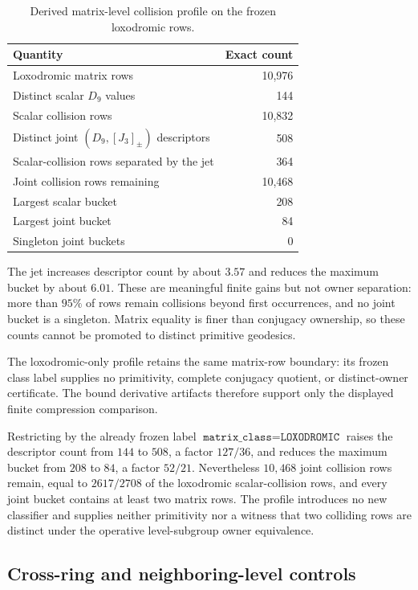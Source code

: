 \documentclass[11pt,a4paper]{article}
\theoremstyle{definition}
\theoremstyle{remark}
\begin{document}
\begin{table}[t]
\centering
\caption{Derived matrix-level collision profile on the frozen loxodromic rows.}
\label{tab:collision-loxodromic}
\begin{tabular}{lr}
\toprule
Quantity & Exact count \\
\midrule
Loxodromic matrix rows & 10,976 \\
Distinct scalar \(D_9\) values & 144 \\
Scalar collision rows & 10,832 \\
Distinct joint \((D_9,[J_3]_{\pm})\) descriptors & 508 \\
Scalar-collision rows separated by the jet & 364 \\
Joint collision rows remaining & 10,468 \\
Largest scalar bucket & 208 \\
Largest joint bucket & 84 \\
Singleton joint buckets & 0 \\
\bottomrule
\end{tabular}
\end{table}

The jet increases descriptor count by about \(3.57\) and reduces the maximum bucket by about \(6.01\). These are meaningful finite gains but not owner separation: more than \(95\%\) of rows remain collisions beyond first occurrences, and no joint bucket is a singleton. Matrix equality is finer than conjugacy ownership, so these counts cannot be promoted to distinct primitive geodesics.

The loxodromic-only profile retains the same matrix-row boundary: its frozen class label supplies no primitivity, complete conjugacy quotient, or distinct-owner certificate. The bound derivative artifacts therefore support only the displayed finite compression comparison.

Restricting by the already frozen label \(\texttt{matrix\_class}=\texttt{LOXODROMIC}\) raises the descriptor count from \(144\) to \(508\), a factor \(127/36\), and reduces the maximum bucket from \(208\) to \(84\), a factor \(52/21\). Nevertheless \(10{,}468\) joint collision rows remain, equal to \(2617/2708\) of the loxodromic scalar-collision rows, and every joint bucket contains at least two matrix rows. The profile introduces no new classifier and supplies neither primitivity nor a witness that two colliding rows are distinct under the operative level-subgroup owner equivalence.

\subsection{Cross-ring and neighboring-level controls}
\end{document}
